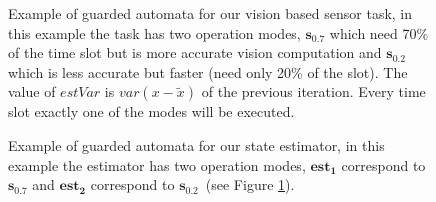 \documentclass[ twoside, 12pt ]{article}
\begin{document}
{\begin{figure}[]
    
    \caption{Example of guarded automata for our vision based sensor task, in this example the task has two operation modes, $\mathbf{s_{0.7}}$ which need 70\% of the time slot but is more accurate vision computation and $\mathbf{s_{0.2}}$ which is less accurate but faster (need only 20\% of the slot).
        The value of $estVar$ is $var(x-\tilde{x})$ of the previous iteration.
        Every time slot exactly one of the modes will be executed.
        \label{fig:sched_sense_auto}}
\end{figure}

\begin{figure}[]
    \centering
    
    
    \caption{Example of guarded automata for our state estimator, in this example the estimator has two operation modes, $\mathbf{est_1}$ correspond to $\mathbf{s_{0.7}}$ and $\mathbf{est_2}$ correspond to $\mathbf{s_{0.2}}$~(see Figure \ref{fig:sched_sense_auto}).
        \label{fig:sched_estimator_auto}}
\end{figure}

}
\end{document}
